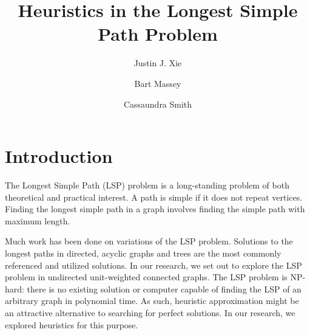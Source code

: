 \documentclass[twocolumn,showpacs,%
  nofootinbib,aps,superscriptaddress,%
  eqsecnum,prd,notitlepage,showkeys,11pt]{article}
\begin{document}
\title{Heuristics in the Longest Simple Path Problem}
\author[1]{Justin J. Xie}
\author[2]{Bart Massey}
\author[2]{Cassaundra Smith}
\date{}



\section{Introduction}

The Longest Simple Path (LSP) problem is a long-standing problem of both theoretical and practical interest. A path is simple if it does not repeat vertices. Finding the longest simple path in a graph involves finding the simple path with maximum length. 

Much work has been done on variations of the LSP problem. Solutions to the longest paths in directed, acyclic graphs and trees are the most commonly referenced and utilized solutions. In our research, we set out to explore the LSP problem in undirected unit-weighted connected graphs. The LSP problem is NP-hard: there is no existing solution or computer capable of finding the LSP of an arbitrary graph in polynomial time. As such, heuristic approximation might be an attractive alternative to searching for perfect solutions. In our research, we explored heuristics for this purpose.
\end{document}
